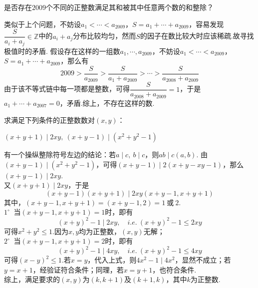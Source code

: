 \documentclass[cn,hazy,black,10pt,normal]{elegantnote}
\newenvironment{guess}{
  \color{guess}}{\newline \color{black}}
\newcommand{\cor}{~\textit{或}~}
\newcommand{\buzhou}[1]{$#1^{\circ} \ $}
\begin{document}
\begin{problem} %
	是否存在$2009$个不同的正整数满足其和被其中任意两个数的和整除？
\end{problem}
\begin{solution}
	\begin{guess}
		类似于上个问题，不妨设$a_1 < \cdots < a_{2009}$，$S=a_1+ \cdots + a_{2009}$，容易发现$\dfrac{S}{a_i+a_j} \in \mathbb{Z}$中的$a_i+a_j$分布比较均匀，然而$S$的因子在数比较大时应该稀疏.故寻找极值时的矛盾.
	\end{guess}
	假设存在这样的一组数$a_1, \cdots ,a_{2009}$，不妨设$a_1 < \cdots < a_{2009}$，$S=a_1+ \cdots + a_{2009}$，那么有$$2009 > \frac{S}{a_{2009}} > \frac{S}{a_1+a_{2009}} > \cdots > \frac{S}{a_{2008}+a_{2009}}$$
	由于该不等式链中每一项都是整数，可得$\dfrac{S}{a_{2008}+a_{2009}}=1$，于是$a_1+ \cdots + a_{2007}=0$，矛盾.综上，不存在这样的数.
\end{solution}

\begin{problem} %
	求满足下列条件的正整数数对$(x,y)$：
	\begin{center}
		$(x+y+1) \mid 2xy,~(x+y-1) \mid (x^2+y^2-1)$
	\end{center}
\end{problem}
\begin{solution}
	\begin{guess}
		有一个操纵整除符号左边的结论：若$a \mid c,~b \mid c$，则$ab \mid c(a,b)$.
	\end{guess}
	由$(x+y-1) \mid (x^2+y^2-1)$，可得$(x+y-1) \mid 2(x+y-xy-1)$，那么$(x+y-1) \mid 2xy$. \\
	又$(x+y+1) \mid 2xy$，于是$$(x+y-1)(x+y+1) \mid 2xy (x+y-1,x+y+1)$$
	其中，$(x+y-1,x+y+1)=(x+y-1,2)=1\cor 2$. \\
	\buzhou{1} 当$(x+y-1,x+y+1)=1$时，即有$$(x+y)^2-1 \mid 2xy,\quad i.e.~(x+y)^2-1 \leq 2xy$$可得$x^2+y^2 \leq 1$.因为$x,y$均为正整数，$(x,y)$无解； \\
	\buzhou{2} 当$(x+y-1,x+y+1)=2$时，即有$$(x+y)^2-1 \mid 4xy,\quad i.e.~(x+y)^2-1 \leq 4xy$$可得$(x-y)^2 \leq 1$.若$x=y$，代入上式，则$4x^2-1 \mid 4x^2$，显然不成立；若$y=x+1$，经验证符合条件；同理，若$x=y+1$，也符合条件. \\
	综上，满足要求的$(x,y)$为$(k,k+1)$及$(k+1,k)$，其中$k$为正整数.
\end{solution}
\end{document}
